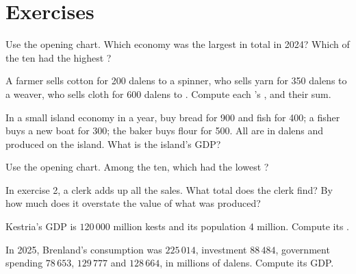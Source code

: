 \section{Exercises}

\begin{exercise}[$\star$]\label{exo:g8:gdp:1}
Use the opening chart. Which economy was the largest in total in 2024? Which of the ten had the
highest ?
\end{exercise}

\begin{exercise}[$\star$]\label{exo:g8:gdp:2}
A farmer sells cotton for 200 dalens to a spinner, who sells yarn for 350 dalens to a weaver, who
sells cloth for 600 dalens to . Compute each 's , and their sum.
\end{exercise}

\begin{exercise}[$\star$]\label{exo:g8:gdp:3}
In a small island economy in a year,  buy bread for 900 and fish for 400; a fisher buys
a new boat for 300; the baker buys flour for 500. All are in dalens and produced on the island.
What is the island's GDP?
\end{exercise}

\begin{exercise}[$\star$]\label{exo:g8:gdp:4}
Use the opening chart. Among the ten, which had the lowest ?
\end{exercise}

\begin{exercise}[$\star\star$]\label{exo:g8:gdp:5}
In exercise 2, a clerk adds up all the sales. What total does the clerk find? By how much does it
overstate the value of what was produced?
\end{exercise}

\begin{exercise}[$\star\star$]\label{exo:g8:gdp:6}
Kestria's GDP is $120\,000$ million kests and its population 4 million. Compute its .
\end{exercise}

\begin{exercise}[$\star\star$]\label{exo:g8:gdp:7}
In 2025, Brenland's consumption was $225\,014$, investment $88\,484$, government spending
$78\,653$,  $129\,777$ and  $128\,664$, in millions of dalens. Compute its GDP.
\end{exercise}

